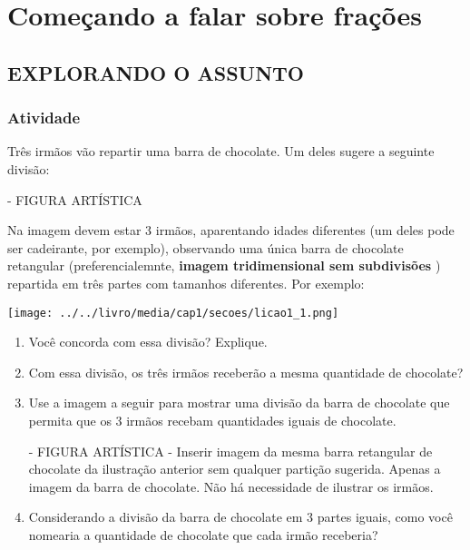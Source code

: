 \documentclass[a4,12pt]{book}
\begin{document}
\chapter{Começando a falar sobre frações }

\section*{EXPLORANDO O ASSUNTO }

\subsection{Atividade}

Três irmãos vão repartir uma barra de chocolate. Um deles sugere a seguinte divisão: 

\begin{imagem*}[breakable]{}{}   - FIGURA ARTÍSTICA   
  
Na imagem devem estar 3 irmãos, aparentando idades diferentes (um deles pode ser cadeirante, por exemplo), observando uma única barra de chocolate retangular (preferencialemnte,   {\bf imagem tridimensional sem subdivisões}  ) repartida em três partes com tamanhos diferentes. Por exemplo:  
  
    \texttt{[image: ../../livro/media/cap1/secoes/licao1\_1.png]}  
  
\end{imagem*}

\begin{enumerate} [\quad a)] %
  \item     Você concorda com essa divisão? Explique.
  \item     Com essa divisão, os três irmãos receberão a mesma quantidade de chocolate?
  \item     Use a imagem a seguir para mostrar uma divisão da barra de chocolate que permita que os 3 irmãos recebam quantidades iguais de chocolate. 
\begin{imagem*}[breakable]{}{}    - FIGURA ARTÍSTICA - Inserir imagem da mesma barra retangular de chocolate da ilustração anterior sem qualquer partição sugerida. Apenas a imagem da barra de chocolate. Não há necessidade de ilustrar os irmãos.\end{imagem*}
  \item     Considerando a divisão da barra de chocolate em 3 partes iguais, como você nomearia a quantidade de chocolate que cada irmão receberia? 
\end{enumerate} %
\end{document}
